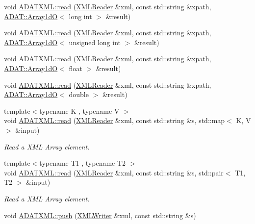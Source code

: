 \begin{DoxyCompactItemize}
\item 
void \mbox{\hyperlink{group__io_gaf73cf1373de71e822e6e7ddb48581714}{A\+D\+A\+T\+X\+M\+L\+::read}} (\mbox{\hyperlink{classADATXML_1_1XMLReader}{X\+M\+L\+Reader}} \&xml, const std\+::string \&xpath, \mbox{\hyperlink{classADAT_1_1Array1dO}{A\+D\+A\+T\+::\+Array1dO}}$<$ long int $>$ \&result)
\item 
void \mbox{\hyperlink{group__io_gabf73a226451fbe3963eed7cf3fbc6849}{A\+D\+A\+T\+X\+M\+L\+::read}} (\mbox{\hyperlink{classADATXML_1_1XMLReader}{X\+M\+L\+Reader}} \&xml, const std\+::string \&xpath, \mbox{\hyperlink{classADAT_1_1Array1dO}{A\+D\+A\+T\+::\+Array1dO}}$<$ unsigned long int $>$ \&result)
\item 
void \mbox{\hyperlink{group__io_ga2fb042288bd86fb85377268d95b5e39f}{A\+D\+A\+T\+X\+M\+L\+::read}} (\mbox{\hyperlink{classADATXML_1_1XMLReader}{X\+M\+L\+Reader}} \&xml, const std\+::string \&xpath, \mbox{\hyperlink{classADAT_1_1Array1dO}{A\+D\+A\+T\+::\+Array1dO}}$<$ float $>$ \&result)
\item 
void \mbox{\hyperlink{group__io_ga6356b58aa7c58aa4bb8eaed5db9f8f40}{A\+D\+A\+T\+X\+M\+L\+::read}} (\mbox{\hyperlink{classADATXML_1_1XMLReader}{X\+M\+L\+Reader}} \&xml, const std\+::string \&xpath, \mbox{\hyperlink{classADAT_1_1Array1dO}{A\+D\+A\+T\+::\+Array1dO}}$<$ double $>$ \&result)
\item 
{\footnotesize template$<$typename K , typename V $>$ }\\void \mbox{\hyperlink{group__io_ga01c7047fcb175e3518660cdab70536c9}{A\+D\+A\+T\+X\+M\+L\+::read}} (\mbox{\hyperlink{classADATXML_1_1XMLReader}{X\+M\+L\+Reader}} \&xml, const std\+::string \&s, std\+::map$<$ K, V $>$ \&input)
\begin{DoxyCompactList}\small\item\em Read a X\+ML Array element. \end{DoxyCompactList}\item 
{\footnotesize template$<$typename T1 , typename T2 $>$ }\\void \mbox{\hyperlink{group__io_gaa94af0693db4178d032a64ee2d3c5439}{A\+D\+A\+T\+X\+M\+L\+::read}} (\mbox{\hyperlink{classADATXML_1_1XMLReader}{X\+M\+L\+Reader}} \&xml, const std\+::string \&s, std\+::pair$<$ T1, T2 $>$ \&input)
\begin{DoxyCompactList}\small\item\em Read a X\+ML Array element. \end{DoxyCompactList}\item 
void \mbox{\hyperlink{group__io_ga019b535f09d2107aa9012cd3fce58193}{A\+D\+A\+T\+X\+M\+L\+::push}} (\mbox{\hyperlink{classADATXML_1_1XMLWriter}{X\+M\+L\+Writer}} \&xml, const std\+::string \&s)

\end{DoxyCompactItemize}
